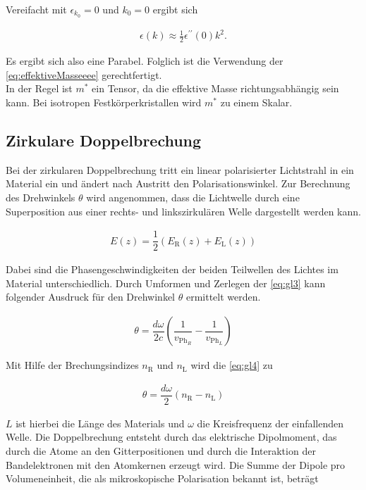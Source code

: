     Vereifacht mit $\epsilon_{k_0} = 0$ und $k_0 = 0$ ergibt sich

    \begin{align*}
        \epsilon(k) \approx \frac{1}{2} \epsilon^{\prime \prime}(0) k^2.
    \end{align*}

    Es ergibt sich also eine Parabel.
    Folglich ist die Verwendung der \autoref{eq:effektiveMasseeee} gerechtfertigt.\\

    In der Regel ist $m^*$ ein Tensor, da die effektive Masse richtungsabhängig sein kann.
    Bei isotropen Festkörperkristallen wird $m^*$ zu einem Skalar.

    \subsection{Zirkulare Doppelbrechung}

    Bei der zirkularen Doppelbrechung tritt ein linear polarisierter Lichtstrahl in ein Material ein und ändert nach Austritt
    den Polarisationswinkel. Zur Berechnung des Drehwinkels $\theta$ wird angenommen, dass die Lichtwelle durch eine Superposition aus einer rechts- und linkszirkulären Welle dargestellt werden kann.

    \begin{align}
    \label{eq:gl3}
    E(z)=\dfrac{1}{2}(E_\text{R}(z)+E_\text{L}(z))
    \end{align}

    Dabei sind die Phasengeschwindigkeiten der beiden Teilwellen des Lichtes im Material unterschiedlich.
    Durch Umformen und Zerlegen der \autoref{eq:gl3} kann folgender Ausdruck für den Drehwinkel $\theta$ ermittelt werden.

    \begin{align}
    \label{eq:gl4}
    \theta= \dfrac{d\omega}{2c} \left(\dfrac{1}{v_{\text{Ph}_R}}-\dfrac{1}{v_{\text{Ph}_L}}\right)
    \end{align}

    Mit Hilfe der Brechungsindizes $n_\text{R}$ und $n_\text{L}$ wird die \autoref{eq:gl4} zu

    \begin{align*}
    \theta= \dfrac{d\omega}{2} (n_\text{R}-n_\text{L})
    \end{align*}

    $L$ ist hierbei die Länge des Materials und $\omega$ die Kreisfrequenz der einfallenden Welle. 
    Die Doppelbrechung entsteht durch das elektrische Dipolmoment, das durch die Atome an den Gitterpositionen und durch die Interaktion der Bandelektronen mit den Atomkernen erzeugt wird. Die Summe der Dipole pro Volumeneinheit, die als mikroskopische Polarisation bekannt ist, beträgt

